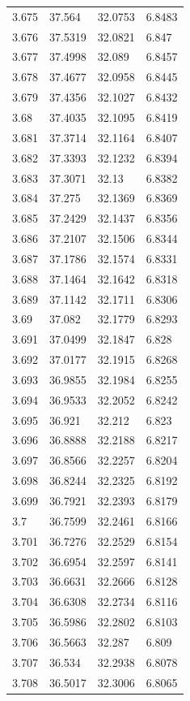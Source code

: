 \begin{tabular}{llll}
3.675 & 37.564 & 32.0753 & 6.8483 \\
3.676 & 37.5319 & 32.0821 & 6.847 \\
3.677 & 37.4998 & 32.089 & 6.8457 \\
3.678 & 37.4677 & 32.0958 & 6.8445 \\
3.679 & 37.4356 & 32.1027 & 6.8432 \\
3.68 & 37.4035 & 32.1095 & 6.8419 \\
3.681 & 37.3714 & 32.1164 & 6.8407 \\
3.682 & 37.3393 & 32.1232 & 6.8394 \\
3.683 & 37.3071 & 32.13 & 6.8382 \\
3.684 & 37.275 & 32.1369 & 6.8369 \\
3.685 & 37.2429 & 32.1437 & 6.8356 \\
3.686 & 37.2107 & 32.1506 & 6.8344 \\
3.687 & 37.1786 & 32.1574 & 6.8331 \\
3.688 & 37.1464 & 32.1642 & 6.8318 \\
3.689 & 37.1142 & 32.1711 & 6.8306 \\
3.69 & 37.082 & 32.1779 & 6.8293 \\
3.691 & 37.0499 & 32.1847 & 6.828 \\
3.692 & 37.0177 & 32.1915 & 6.8268 \\
3.693 & 36.9855 & 32.1984 & 6.8255 \\
3.694 & 36.9533 & 32.2052 & 6.8242 \\
3.695 & 36.921 & 32.212 & 6.823 \\
3.696 & 36.8888 & 32.2188 & 6.8217 \\
3.697 & 36.8566 & 32.2257 & 6.8204 \\
3.698 & 36.8244 & 32.2325 & 6.8192 \\
3.699 & 36.7921 & 32.2393 & 6.8179 \\
3.7 & 36.7599 & 32.2461 & 6.8166 \\
3.701 & 36.7276 & 32.2529 & 6.8154 \\
3.702 & 36.6954 & 32.2597 & 6.8141 \\
3.703 & 36.6631 & 32.2666 & 6.8128 \\
3.704 & 36.6308 & 32.2734 & 6.8116 \\
3.705 & 36.5986 & 32.2802 & 6.8103 \\
3.706 & 36.5663 & 32.287 & 6.809 \\
3.707 & 36.534 & 32.2938 & 6.8078 \\
3.708 & 36.5017 & 32.3006 & 6.8065 \\

\end{tabular}
